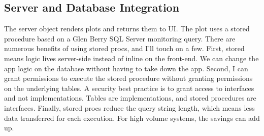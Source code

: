 \documentclass[]{article}
\begin{document}
\hypertarget{server-and-database-integration}{%
\subsection{Server and Database
Integration}\label{server-and-database-integration}}

The server object renders plots and returns them to UI. The plot uses a
stored procedure based on a Glen Berry SQL Server monitoring query.
There are numerous benefits of using stored procs, and I'll touch on a
few. First, stored means logic lives server-side instead of inline on
the front-end. We can change the app logic on the database without
having to take down the app. Second, I can grant permissions to execute
the stored procedure without granting permissions on the underlying
tables. A security best practice is to grant access to interfaces and
not implementations. Tables are implementations, and stored procedures
are interfaces. Finally, stored procs reduce the query string length,
which means less data transferred for each execution. For high volume
systems, the savings can add up.
\end{document}
